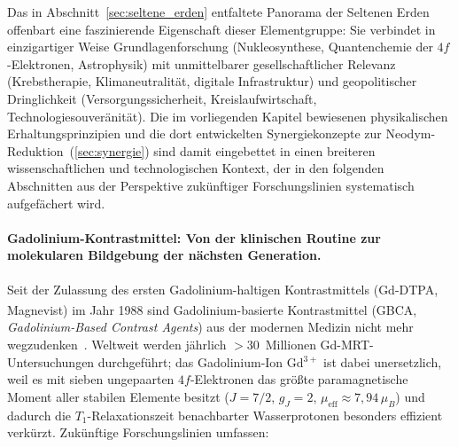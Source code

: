 ﻿\documentclass[12pt, a4paper]{report}
\theoremstyle{definition}
\theoremstyle{remark}
\begin{document}
Das in Abschnitt~\ref{sec:seltene_erden} entfaltete Panorama der Seltenen
Erden offenbart eine faszinierende Eigenschaft dieser Elementgruppe: Sie
verbindet in einzigartiger Weise Grundlagenforschung (Nukleosynthese,
Quantenchemie der $4f$-Elektronen, Astrophysik) mit unmittelbarer gesellschaft\-licher
Relevanz (Krebstherapie, Klimaneutralität, digitale Infrastruktur) und
geopolitischer Dringlichkeit (Versorgungssicherheit, Kreislaufwirtschaft,
Technologiesouveränität). Die im vorliegenden Kapitel bewiesenen
physikalischen Erhaltungsprinzipien und die dort entwickelten
Synergiekonzepte zur Neodym-Reduktion~(\ref{sec:synergie}) sind damit
eingebettet in einen breiteren wissenschaftlichen und technologischen
Kontext, der in den folgenden Abschnitten aus der Perspektive zukünftiger
Forschungslinien systematisch aufgefächert wird.

\paragraph{Gadolinium-Kontrastmittel: Von der klinischen Routine zur
molekularen Bildgebung der nächsten Generation.}
Seit der Zulassung des ersten Gadolinium-haltigen Kontrastmittels
(Gd-DTPA, Magnevist\textsuperscript{\textregistered}) im Jahr 1988 sind
Gadolinium-basierte Kontrastmittel (GBCA, \emph{Gadolinium-Based Contrast
Agents}) aus der modernen Medizin nicht mehr wegzudenken~\cite{caravan1999}.
Weltweit werden jährlich $>30$~Millionen Gd-MRT-Untersuchungen durchgeführt;
das Gadolinium-Ion Gd$^{3+}$ ist dabei unersetzlich, weil es mit sieben
ungepaarten $4f$-Elektronen das größte paramagnetische Moment aller stabilen
Elemente besitzt ($J = 7/2$, $g_J = 2$, $\mu_{\mathrm{eff}} \approx 7{,}94\,\mu_B$)
und dadurch die $T_1$-Relaxationszeit benachbarter Wasserprotonen besonders
effizient verkürzt. Zukünftige Forschungslinien umfassen:
\end{document}
